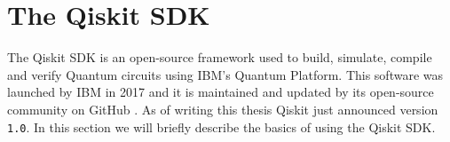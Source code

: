\chapter{The Qiskit SDK}

The Qiskit SDK is an open-source framework used to build, simulate, compile and verify Quantum circuits using IBM's Quantum Platform.
This software was launched by IBM in 2017 and it is maintained and updated by its open-source community on GitHub \cite{QiskitGitHub}.
As of writing this thesis Qiskit just announced version \verb|1.0|. In this section we will briefly describe the basics of using the
Qiskit SDK.




